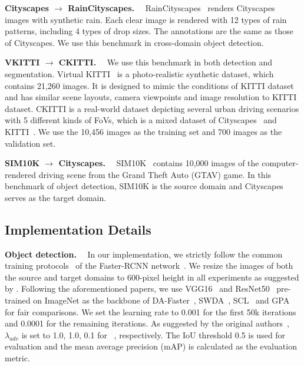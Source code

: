 \documentclass[10pt,journal,compsoc]{IEEEtran}
\renewcommand{\paragraph}[1]{\noindent\textbf{#1}~~}
\begin{document}
\paragraph{Cityscapes $\rightarrow$ RainCityscapes.} RainCityscapes~\cite{rainy_city} renders Cityscapes images with synthetic rain. Each clear image is rendered with 12 types of rain patterns, including 4 types of drop sizes. The annotations are the same as those of Cityscapes. We use this benchmark in cross-domain object detection.

\paragraph{VKITTI $\rightarrow$ CKITTI.}  We use this benchmark in both detection and segmentation. Virtual KITTI~\cite{VKITTI} is a photo-realistic synthetic dataset, which contains 21,260 images. 
It is designed to mimic the conditions of  KITTI dataset and 
has similar scene layouts, camera viewpoints and image resolution to KITTI dataset.
CKITTI is a real-world dataset depicting several urban driving scenarios with 5 different kinds of FoVs, which is a mixed dataset of Cityscapes~\cite{cordts2016cityscapes} and KITTI~\cite{kITTI}. We use the 10,456 images as the training set and 700 images as the validation set. 


\paragraph{SIM10K $\rightarrow$ Cityscapes.} SIM10K~\cite{sim10k} contains 10,000 images of the computer-rendered driving scene from the Grand Theft Auto (GTAV) game. In this benchmark of object detection, SIM10K is the source domain and Cityscapes~\cite{cordts2016cityscapes} serves as the target domain.



\subsection{Implementation Details}
\label{sec:implementation details}
\paragraph{Object detection.}
In our implementation, we strictly follow the common training protocols~\cite{DA-Faster-RCNN,SWDA,SCL,GPA} of the Faster-RCNN network~\cite{ren2016faster}. We resize the images of both the source and target domains to 600-pixel height in all experiments as suggested by \cite{DA-Faster-RCNN,SWDA,SCL}. Following the aforementioned papers, we use VGG16~\cite{vgg} and ResNet50~\cite{he2016deep} pre-trained on ImageNet \cite{deng2009imagenet} as the backbone of DA-Faster~\cite{DA-Faster-RCNN}, SWDA~\cite{SWDA}, SCL~\cite{SCL} and GPA~\cite{GPA} for fair comparisons. We set the learning rate to 0.001 for the first 50k iterations and 0.0001 for the remaining iterations.  As suggested by the original authors~\cite{DA-Faster-RCNN,SWDA,SCL}, $\lambda_{adv}$ is set to 1.0, 1.0, 0.1 for ~\cite{SCL,SWDA,DA-Faster-RCNN}, respectively.
The IoU threshold 0.5 is used for evaluation and the mean average precision (mAP) is calculated as the evaluation metric. 
\end{document}
